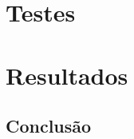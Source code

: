 \documentclass[
	12pt,				%
	openright,			%
	oneside,			%
	a4paper,			%
	english,			%
	french,				%
	spanish,			%
	brazil,				%
	]{abntex2}
\begin{document}



\part{Testes}


\part{Resultados}



\chapter*[Conclusão]{Conclusão}

\lipsum[31-33]

\postextual



%
%

\end{document}
